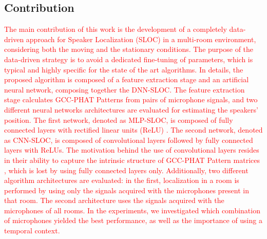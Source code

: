 \documentclass[review]{elsarticle}
\begin{document}
\subsection{Contribution}
\textcolor{red}{
The main contribution of this work is the development of a completely data-driven approach for Speaker Localization (SLOC) in a multi-room environment, considering both the moving and the stationary conditions. %
The purpose of the data-driven strategy is to avoid a dedicated fine-tuning of parameters, which is typical and highly specific for the state of the art algorithms.
In details, the proposed algorithm is composed of a feature extraction stage and an artificial neural network, composing together the DNN-SLOC. %
The feature extraction stage calculates GCC-PHAT Patterns \cite{xiao2015learning} from pairs of microphone signals, and two different neural networks architectures are evaluated for estimating the speakers' position. The first network, denoted as MLP-SLOC, is composed of fully connected layers with rectified linear units (ReLU) \cite{nair2010rectified}. The second network, denoted as CNN-SLOC, is composed of convolutional layers followed by fully connected layers with ReLUs. The motivation behind the use of convolutional layers resides in their ability to capture the intrinsic structure of GCC-PHAT Pattern matrices \cite{xiao2015learning}, which is lost by using fully connected layers only. Additionally, two different algorithm architectures are evaluated: in the first, localization in a room is performed by using only the signals acquired with the microphones present in that room. The second architecture uses the signals acquired with the microphones of all rooms. In the experiments, we investigated which combination of microphones yielded the best performance, as well as the importance of using a temporal context.
}

\end{document}

